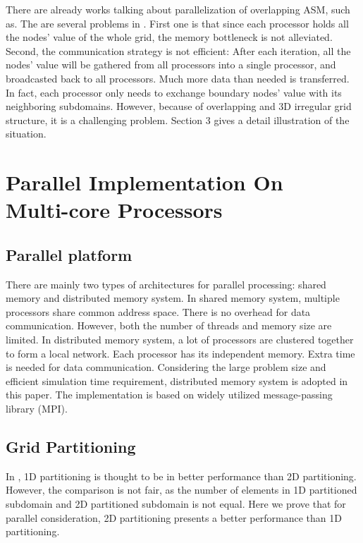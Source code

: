 \documentclass{sig-alternate}
\begin{document}
	There are already works talking about parallelization of overlapping ASM, such as\cite{kaisun}. The are several problems in 
	\cite{kaisun}. First one is that since each processor holds all the nodes' value of the whole grid, the memory bottleneck
	is not alleviated. Second, the communication strategy is not efficient: After each iteration, all the
	nodes' value will be gathered from all processors into a single processor, and broadcasted back to all processors. Much more
	data than needed is transferred. In fact, each processor only needs to exchange boundary nodes' value with its neighboring 
	subdomains. However, because of overlapping and 3D irregular grid structure, it is a challenging problem. Section 3
	gives a detail illustration of the situation.
 
\section{Parallel Implementation On \\Multi-core Processors}
  \subsection{Parallel platform}
	There are mainly two types of architectures for parallel processing: shared memory and distributed memory system. In shared 
	memory system, 
	multiple processors share common address space. There is no overhead for data communication. However, both the number
	of threads and memory size are limited. In distributed 
	memory system, a lot of processors are clustered together to form a local network. Each processor has its independent memory. 
	Extra time is needed for data communication. Considering the large problem 
	size and efficient simulation time requirement, distributed memory system is adopted in this paper. The implementation is based
	on widely utilized message-passing library (MPI).
  \subsection{Grid Partitioning}
	In \cite{Zhongyu}, 1D partitioning is thought to be in better performance than 2D partitioning. However, the comparison is not 
	fair, as the number of elements in 1D partitioned subdomain and 2D partitioned subdomain is not equal. Here we prove that
	for parallel consideration, 2D partitioning presents a better performance than 1D partitioning. 
\end{document}
